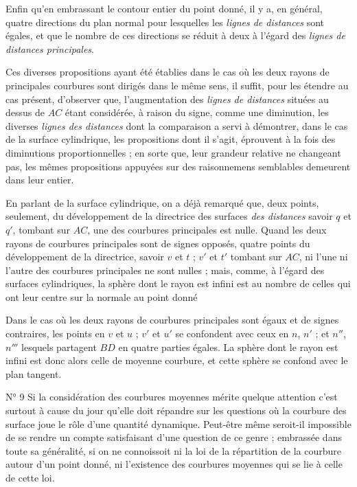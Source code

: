\documentclass[11pt,a4paper]{article}
\begin{document}
Enfin qu'en embrassant le contour entier du point donné, il y a, en
général, quatre directions du plan normal pour lesquelles les
\emph{lignes de distances} sont égales, et que le nombre de ces
directions se réduit à deux à l'égard des \emph{lignes de distances
principales}.

Ces diverses propositions ayant été établies dans le cas où les deux
rayons de principales courbures sont dirigés dans le même sens, il
suffit, pour les étendre au cas présent, d'observer que,
l'augmentation des \emph{lignes de distances} situées au dessus de
$AC$ étant considérée, à raison du signe, comme une diminution, les
diverses \emph{lignes des distances} dont la comparaison a servi à
démontrer, dans le cas de la surface cylindrique, les propositions
dont il s'agit, éprouvent à la fois des diminutions proportionnelles ;
en sorte que, leur grandeur relative ne changeant pas, les mêmes
propositions appuyées sur des raisonnemens semblables demeurent dans
leur entier.

En parlant de la surface cylindrique, on a déjà remarqué que, deux
points, seulement, du développement de la directrice des surfaces
\emph{des distances} savoir $q$ et $q'$, tombant sur $AC$, une des
courbures principales est nulle. Quand les deux rayons de courbures
principales sont de signes opposés, quatre points du développement de
la directrice, savoir $v$ et $t$ ; $v'$ et $t'$ tombant sur $AC$, ni
l'une ni l'autre des courbures principales ne sont nulles ; mais,
comme, à l'égard des surfaces cylindriques, la sphère dont le rayon
est infini est au nombre de celles qui ont leur centre sur la normale
au point donné

Dans le cas où les deux rayons de courbures principales sont égaux et
de signes contraires, les points en $v$ et $u$ ; $v'$ et $u'$ se
confondent avec ceux en $n$, $n'$ ; et $n''$, $n'''$ lesquels
partagent $BD$ en quatre parties égales. La sphère dont le rayon est
infini est donc alors celle de moyenne courbure, et cette sphère se
confond avec le plan tangent.

N° 9 Si la considération des courbures moyennes mérite quelque
attention c'est surtout à cause du jour qu'elle doit répandre sur les
questions où la courbure des surface joue le rôle d'une quantité
dynamique. Peut-être même seroit-il impossible de se rendre un compte
satisfaisant d'une question de ce genre ; embrassée dans toute sa
généralité, si on ne connoissoit ni la loi de la répartition de la
courbure autour d'un point donné, ni l'existence des courbures
moyennes qui se lie à celle de cette loi.
\end{document}
